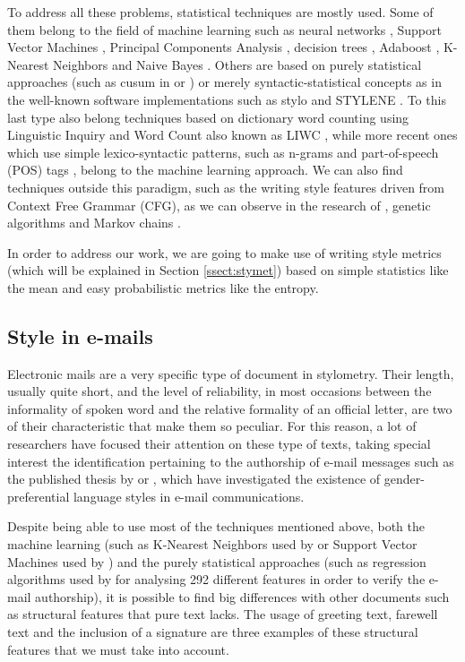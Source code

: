 To address all these problems, statistical techniques are mostly used. Some of them belong to the field of machine learning such as neural networks \citep{ng1997feature}, Support Vector Machines \citep{abbasi2005applying}, Principal Components Analysis \citep{PCAstyle}, decision trees \citep{apte1998text}, Adaboost \citep{cheng2011author}, K-Nearest Neighbors \citep{kucukyilmaz2008chat} and Naive Bayes \citep{sahami1998bayesian}. Others are based on purely statistical approaches (such as cusum in \cite{summers1999analysing} or \cite{thisted1987did}) or merely syntactic-statistical concepts as in the well-known software implementations such as stylo \citep{stylor} and STYLENE \citep{stylene}. To this last type also belong techniques based on dictionary word counting using Linguistic Inquiry and Word Count also known as LIWC \citep{liwc2015}, while more recent ones which use simple lexico-syntactic patterns, such as n-grams and part-of-speech (POS) tags \citep{mihalcea2009lie, ott2011finding}, belong to the machine learning approach. We can also find techniques outside this paradigm, such as the writing style features driven from Context Free Grammar (CFG), as we can observe in the research of \cite{cfgstylo}, genetic algorithms \citep{holmes1995federalist} and Markov chains \citep{tweedie1998variable}.

In order to address our work, we are going to make use of writing style metrics (which will be explained in Section \ref{ssect:stymet}) based on simple statistics like the mean and easy probabilistic metrics like the entropy.

\subsection{Style in e-mails}\label{ssect:styloemail}
Electronic mails are a very specific type of document in stylometry. Their length, usually quite short, and the level of reliability, in most occasions between the informality of spoken word and the relative formality of an official letter, are two of their characteristic that make them so peculiar. For this reason, a lot of researchers have focused their attention on these type of texts, taking special interest the identification pertaining to the authorship of e-mail messages such as the published thesis by \cite{corney2003analysing} or \cite{thomson2001predicting}, which have investigated the existence of gender-preferential language styles in e-mail communications.

Despite being able to use most of the techniques mentioned above, both the machine learning (such as K-Nearest Neighbors used by \cite{calix2008stylometry} or Support Vector Machines used by \cite{de2001mining}) and the purely statistical approaches (such as regression algorithms used by \cite{iqbal2010mining} for analysing 292 different features in order to verify the e-mail authorship), it is possible to find big differences with other documents such as structural features that pure text lacks. The usage of greeting text, farewell text and the inclusion of a signature are three examples of these structural features that we must take into account.


